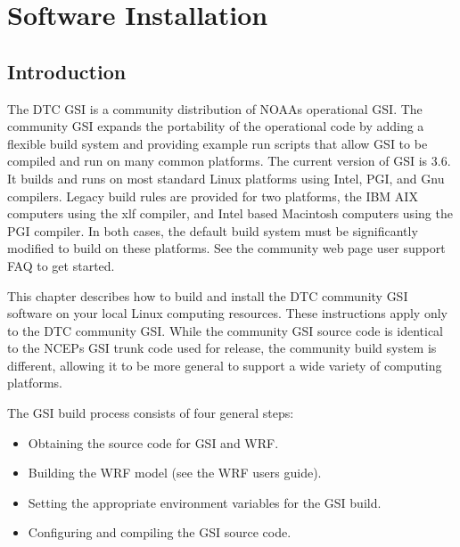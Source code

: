 \chapter{Software Installation}\label{gsi_install}
\setlength{\parskip}{12pt}

\section{Introduction}

The DTC GSI is a community distribution of NOAA\textquotesingle s operational GSI. 
The community GSI expands the portability of the operational code by adding a flexible build 
system and providing example run scripts that allow GSI to be compiled and run on many common 
platforms. The current version of GSI is 3.6. It builds and runs on most standard
Linux platforms using Intel, PGI, and Gnu compilers. Legacy build rules are provided for 
two platforms, the IBM AIX computers using the xlf compiler, and Intel based Macintosh 
computers using the PGI compiler. In both cases, the default build system must be significantly modified to 
build on these platforms. See the community web page user support FAQ to get started.

This chapter describes how to build and install the DTC community GSI software on your local 
Linux computing resources. These instructions apply only to the DTC community GSI. While 
the community GSI source code is identical to the NCEP\textquotesingle s GSI 
trunk code used for release, the community build system is different, allowing it to be more 
general to support a wide variety of computing platforms.

The GSI build process consists of four general steps:
\begin{itemize}
\item Obtaining the source code for GSI and WRF.
\item Building the WRF model (see the WRF user\textquotesingle s guide).
\item Setting the appropriate environment variables for the GSI build.
\item Configuring and compiling the GSI source code.
\end{itemize}

